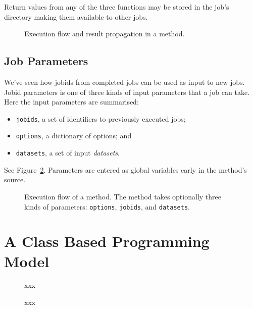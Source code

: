 Return values from any of the three functions may be stored in the
job's directory making them available to other jobs.


\begin{figure}[h!]
  \begin{center}
    
    \caption{Execution flow and result propagation in a method.}
    \label{fig:prepanasyn}
  \end{center}
\end{figure}



\subsection{Job Parameters}
\label{sec:jobparams}
We've seen how jobids from completed jobs can be used as input to new
jobs.  Jobid parameters is one of three kinds of input parameters that
a job can take.  Here the input parameters are summarised:
\begin{itemize}
\item[] \texttt{jobids}, a set of identifiers to previously executed jobs;
\item[] \texttt{options}, a dictionary of options; and
\item[] \texttt{datasets}, a set of input \textsl{datasets}.
\end{itemize}
See Figure~\ref{fig:execflow}.  Parameters are entered as global
variables early in the method's source.


\begin{figure}[h!]
  \begin{center}
    
    \caption{Execution flow of a method.  The method takes optionally
      three kinds of parameters: \texttt{options}, \texttt{jobids},
      and \texttt{datasets}.}
    \label{fig:execflow}
  \end{center}
\end{figure}





\section{A Class Based Programming Model}

\begin{figure}[h!]
  \begin{center}
    
    \caption{xxx}
    \label{fig:classes}
  \end{center}
\end{figure}

\begin{figure}[h!]
  \begin{center}
    
    \caption{xxx}
    \label{fig:classes}
  \end{center}
\end{figure}





